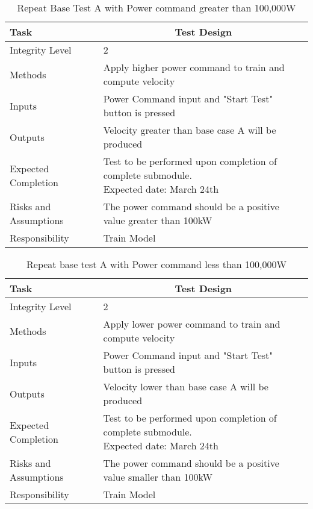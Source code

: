 \documentclass[]{article}
\begin{document}
	\begin{table}[H]
		\centering
		\caption{Repeat Base Test A with Power command greater than 100,000W}
		\begin{tabular}{|l|l|}
			\hline
			Task & \multicolumn{1}{c|}{Test Design} \\ \hline
			Integrity Level & 2 \\ \hline
			Methods & Apply higher power command to train and compute velocity  \\ \hline
			Inputs &  Power Command input and "Start Test" button is pressed \\ \hline
			Outputs &  Velocity greater than base case A will be produced  \\ \hline
			Expected Completion & \parbox[t]{10cm}{Test to be performed upon completion of complete submodule.\\ Expected date: March 24th}\\ \hline
			Risks and Assumptions & The power command should be a positive value greater than 100kW \\ \hline
			Responsibility & Train Model\\ \hline
		\end{tabular}
	\end{table}
    
    \begin{table}[H]
    	\centering
    	\caption{Repeat base test A with Power command less than 100,000W}
    	\begin{tabular}{|l|l|}
    		\hline
    		Task & \multicolumn{1}{c|}{Test Design} \\ \hline
    		Integrity Level & 2 \\ \hline
    		Methods & Apply lower power command to train and compute velocity  \\ \hline
    		Inputs &  Power Command input and "Start Test" button is pressed \\ \hline
    		Outputs &  Velocity lower than base case A will be produced  \\ \hline
    		Expected Completion & \parbox[t]{10cm}{Test to be performed upon completion of complete submodule.\\ Expected date: March 24th}\\ \hline
    		Risks and Assumptions & The power command should be a positive value smaller than 100kW \\ \hline
    		Responsibility & Train Model\\ \hline
    	\end{tabular}
    \end{table}
\end{document}
